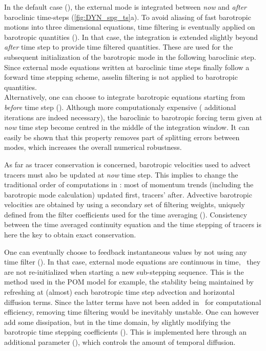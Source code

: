 \documentclass[../main/NEMO_manual]{subfiles}
\begin{document}
In the default case (),
the external mode is integrated between \textit{now} and \textit{after} baroclinic time-steps
(\autoref{fig:DYN_spg_ts}a).
To avoid aliasing of fast barotropic motions into three dimensional equations,
time filtering is eventually applied on barotropic quantities ().
In that case, the integration is extended slightly beyond \textit{after} time step to
provide time filtered quantities.
These are used for the subsequent initialization of the barotropic mode in the following baroclinic step.
Since external mode equations written at baroclinic time steps finally follow a forward time stepping scheme,
asselin filtering is not applied to barotropic quantities.\\
Alternatively, one can choose to integrate barotropic equations starting from \textit{before} time step
().
Although more computationaly expensive (  additional iterations are indeed necessary),
the baroclinic to barotropic forcing term given at \textit{now} time step become centred in
the middle of the integration window.
It can easily be shown that this property removes part of splitting errors between modes,
which increases the overall numerical robustness.


As far as tracer conservation is concerned,
barotropic velocities used to advect tracers must also be updated at \textit{now} time step.
This implies to change the traditional order of computations in \NEMO:
most of momentum trends (including the barotropic mode calculation) updated first, tracers' after.
Advective barotropic velocities are obtained by using a secondary set of filtering weights,
uniquely defined from the filter coefficients used for the time averaging (\citet{shchepetkin.mcwilliams_OM05}).
Consistency between the time averaged continuity equation and the time stepping of tracers is here the key to
obtain exact conservation.


One can eventually choose to feedback instantaneous values by not using any time filter
().
In that case, external mode equations are continuous in time,
\ie\ they are not re-initialized when starting a new sub-stepping sequence.
This is the method used in the POM model for example, the stability being maintained by
refreshing at (almost) each barotropic time step advection and horizontal diffusion terms.
Since the latter terms have not been added in \NEMO\ for computational efficiency,
removing time filtering would be inevitably unstable. One can however add some dissipation, but in the time domain, by slightly modifying the barotropic time stepping coefficients (\citet{demange_JCP19}). This is implemented here through an additional parameter (), which controls the amount of temporal diffusion.
\end{document}
